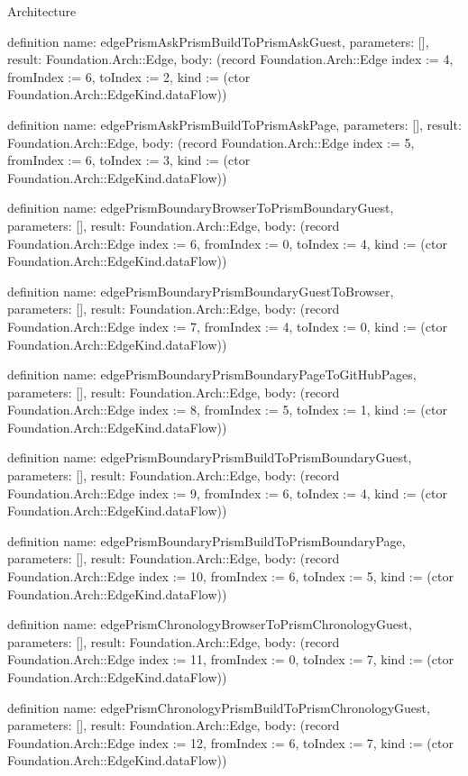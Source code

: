 \begin{lexlean}{Architecture}
\begin{semanticmodule}
definition{
  name: edgePrismAskPrismBuildToPrismAskGuest,
  parameters: [],
  result: Foundation.Arch::Edge,
  body: (record Foundation.Arch::Edge {index := 4, fromIndex := 6, toIndex := 2, kind := (ctor Foundation.Arch::EdgeKind.dataFlow)})
}

definition{
  name: edgePrismAskPrismBuildToPrismAskPage,
  parameters: [],
  result: Foundation.Arch::Edge,
  body: (record Foundation.Arch::Edge {index := 5, fromIndex := 6, toIndex := 3, kind := (ctor Foundation.Arch::EdgeKind.dataFlow)})
}

definition{
  name: edgePrismBoundaryBrowserToPrismBoundaryGuest,
  parameters: [],
  result: Foundation.Arch::Edge,
  body: (record Foundation.Arch::Edge {index := 6, fromIndex := 0, toIndex := 4, kind := (ctor Foundation.Arch::EdgeKind.dataFlow)})
}

definition{
  name: edgePrismBoundaryPrismBoundaryGuestToBrowser,
  parameters: [],
  result: Foundation.Arch::Edge,
  body: (record Foundation.Arch::Edge {index := 7, fromIndex := 4, toIndex := 0, kind := (ctor Foundation.Arch::EdgeKind.dataFlow)})
}

definition{
  name: edgePrismBoundaryPrismBoundaryPageToGitHubPages,
  parameters: [],
  result: Foundation.Arch::Edge,
  body: (record Foundation.Arch::Edge {index := 8, fromIndex := 5, toIndex := 1, kind := (ctor Foundation.Arch::EdgeKind.dataFlow)})
}

definition{
  name: edgePrismBoundaryPrismBuildToPrismBoundaryGuest,
  parameters: [],
  result: Foundation.Arch::Edge,
  body: (record Foundation.Arch::Edge {index := 9, fromIndex := 6, toIndex := 4, kind := (ctor Foundation.Arch::EdgeKind.dataFlow)})
}

definition{
  name: edgePrismBoundaryPrismBuildToPrismBoundaryPage,
  parameters: [],
  result: Foundation.Arch::Edge,
  body: (record Foundation.Arch::Edge {index := 10, fromIndex := 6, toIndex := 5, kind := (ctor Foundation.Arch::EdgeKind.dataFlow)})
}

definition{
  name: edgePrismChronologyBrowserToPrismChronologyGuest,
  parameters: [],
  result: Foundation.Arch::Edge,
  body: (record Foundation.Arch::Edge {index := 11, fromIndex := 0, toIndex := 7, kind := (ctor Foundation.Arch::EdgeKind.dataFlow)})
}

definition{
  name: edgePrismChronologyPrismBuildToPrismChronologyGuest,
  parameters: [],
  result: Foundation.Arch::Edge,
  body: (record Foundation.Arch::Edge {index := 12, fromIndex := 6, toIndex := 7, kind := (ctor Foundation.Arch::EdgeKind.dataFlow)})
}


\end{semanticmodule}
\end{lexlean}
